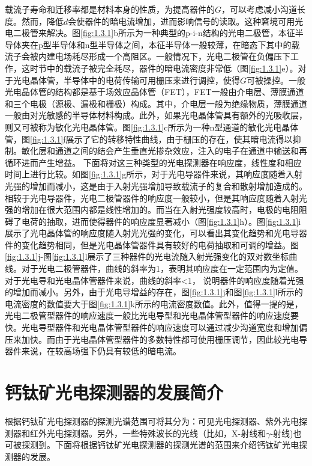 \documentclass[forlib]{WHUMaster}   %
\begin{document}
{载流子寿命和迁移率都是材料本身的性质，为提高器件的$G$，可以考虑减小沟道长度。然而，降低$d$会使器件的暗电流增加，进而影响信号的读取。这种窘境可用光电二极管来解决。图\ref{fig:1.3.1}b所示为一种典型的p-i-n结构的光电二极管，本征半导体夹在p型半导体和n型半导体之间，本征半导体一般较薄，在暗态下其中的载流子会被内建电场耗尽形成一个高阻区。一般情况下，光电二极管在负偏压下工作，这时节中的载流子被完全耗尽，器件的暗电流密度非常低（图\ref{fig:1.3.1}e）。对于光电晶体管，半导体中的电荷传输可用栅压来进行调控，使得$G$可被操控。一般光电晶体管的结构都是基于场效应晶体管（FET），FET一般由介电层、薄膜通道和三个电极（源极、漏极和栅极）构成。其中，介电层一般为绝缘物质，薄膜通道一般由对光敏感的半导体材料构成。此外，如果光电晶体管具有额外的光吸收层，则又可被称为敏化光电晶体管。图\ref{fig:1.3.1}c所示为一种n型通道的敏化光电晶体管，图\ref{fig:1.3.1}f展示了它的转移特性曲线，由于栅压的存在，使其暗电流得以抑制。敏化层和通道之间的结会产生垂直光掺杂效应，注入的电子在通道中输送和再循环进而产生增益。 下面将对这三种类型的光电探测器在响应度，线性度和相应时间上进行比较。如图\ref{fig:1.3.1}g所示，对于光电导器件来说，其响应度随着入射光强的增加而减小，这是由于入射光强增加导致载流子的复合和散射增加造成的。相较于光电导器件，光电二极管器件的响应度一般较小，但是其响应度随着入射光强的增加在很大范围内都是线性增加的。而当在入射光强度较高时，电极的电阻阻碍了电荷的抽取，进而使得器件的响应度显著减小（图\ref{fig:1.3.1}h）。图\ref{fig:1.3.1}i展示了光电晶体管的响应度随入射光光强的变化，可以看出其变化趋势和光电导器件的变化趋势相同，但是光电晶体管器件具有较好的电荷抽取和可调的增益。图\ref{fig:1.3.1}j-图\ref{fig:1.3.1}l展示了三种器件的光电流随入射光强变化的双对数坐标曲线。对于光电二极管器件，曲线的斜率为1，表明其响应度在一定范围内为定值。对于光电导和光电晶体管器件来说，曲线的斜率<1， 说明器件的响应度随着光强的增加而减小。另外，由于光电导增益的存在，图\ref{fig:1.3.1}j和图\ref{fig:1.3.1}l所示的电流密度的数值要大于图\ref{fig:1.3.1}k所示的电流密度数值。此外，值得一提的是，光电二极管型器件的响应速度一般比光电导型和光电晶体管型器件的响应速度要快。光电导型器件和光电晶体管型器件的响应速度可以通过减少沟道宽度和增加偏压来加快。而由于光电晶体管型器件的多数特性都可使用栅压调节，因此较光电导器件来说，在较高场强下仍具有较低的暗电流。

\section{钙钛矿光电探测器的发展简介}

根据钙钛矿光电探测器的探测光谱范围可将其分为：可见光电探测器、紫外光电探测器和红外光电探测器。另外，一些特殊波长的光线（比如，X-射线和$\gamma$-射线)也可被探测到。下面将根据钙钛矿光电探测器的探测光谱的范围来介绍钙钛矿光电探测器的发展。

}
\end{document}
